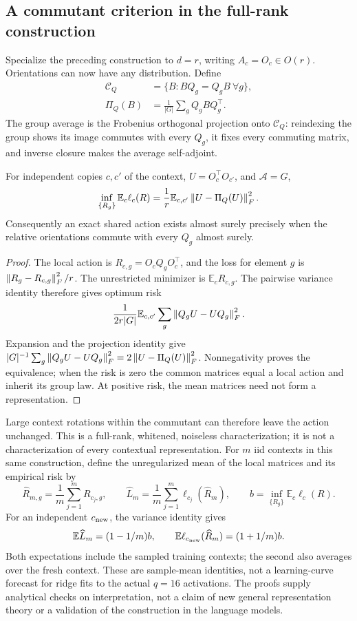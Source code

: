 \subsection{A commutant criterion in the full-rank construction}
\label{app:commutant}
Specialize the preceding construction to $d=r$, writing $A_c=O_c\in O(r)$. Orientations can now have any distribution. Define
\begin{align*}
 \mathcal C_Q&=\{B:BQ_g=Q_gB\ \forall g\},\\
 \Pi_Q(B)&=\frac1{|G|}\sum_g Q_gBQ_g^\top.
\end{align*}
The group average is the Frobenius orthogonal projection onto $\mathcal C_Q$: reindexing the group shows its image commutes with every $Q_g$, it fixes every commuting matrix, and inverse closure makes the average self-adjoint.

\begin{proposition}
\label{prop:commutant}
For independent copies $c,c'$ of the context, $U=O_c^\top O_{c'}$, and $\mathcal A=G$,
\[
 \inf_{\{R_g\}}\mathbb E_c\ell_c(R)
 =\frac1r\mathbb E_{c,c'}\left\lVert U-\Pi_Q(U)\right\rVert_F^2.
\]
Consequently an exact shared action exists almost surely precisely when the relative orientations commute with every $Q_g$ almost surely.
\end{proposition}
\begin{proof}
The local action is $R_{c,g}=O_cQ_gO_c^\top$, and the loss for element $g$ is $\left\lVert R_g-R_{c,g}\right\rVert_F^2/r$. The unrestricted minimizer is $\mathbb E_cR_{c,g}$. The pairwise variance identity therefore gives optimum risk
\[
 \frac1{2r|G|}\mathbb E_{c,c'}\sum_g\left\lVert Q_gU-UQ_g\right\rVert_F^2.
\]
Expansion and the projection identity give $|G|^{-1}\sum_g\left\lVert Q_gU-UQ_g\right\rVert_F^2=2\left\lVert U-\Pi_Q(U)\right\rVert_F^2$. Nonnegativity proves the equivalence; when the risk is zero the common matrices equal a local action and inherit its group law. At positive risk, the mean matrices need not form a representation.
\end{proof}
Large context rotations within the commutant can therefore leave the action unchanged. This is a full-rank, whitened, noiseless characterization; it is not a characterization of every contextual representation. For $m$ iid contexts in this same construction, define the unregularized mean of the local matrices and its empirical risk by
\[
 \widehat R_{m,g}=\frac1m\sum_{j=1}^mR_{c_j,g},\qquad
 \widehat L_m=\frac1m\sum_{j=1}^m\ell_{c_j}(\widehat R_m),\qquad
 b=\inf_{\{R_g\}}\mathbb E_c\ell_c(R).
\]
For an independent $c_{\rm new}$, the variance identity gives
\[
 \mathbb E\widehat L_m=(1-1/m)b,\qquad
 \mathbb E\ell_{c_{\rm new}}(\widehat R_m)=(1+1/m)b.
\]
Both expectations include the sampled training contexts; the second also averages over the fresh context. These are sample-mean identities, not a learning-curve forecast for ridge fits to the actual $q=16$ activations. The proofs supply analytical checks on interpretation, not a claim of new general representation theory or a validation of the construction in the language models.

